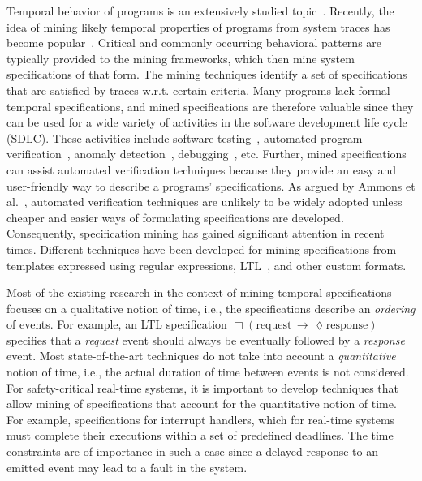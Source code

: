 \documentclass[]{sigplanconf}
\begin{document}
Temporal behavior of programs is an extensively studied topic~\cite{lamport1978time, dwyer1999patterns}. %
Recently, the idea of mining likely temporal properties of programs from system traces has become popular~\cite{lemieux2015general}.
Critical and commonly occurring behavioral patterns are typically provided to the mining frameworks, which then mine system specifications of that form. The mining techniques identify a set of specifications that are satisfied by traces w.r.t. certain criteria.
Many programs lack formal temporal specifications, and mined specifications are therefore valuable since they can be used for a wide variety of activities in the software development life cycle (SDLC).
These activities include software testing~\cite{dallmeier2010generating}, automated program verification~\cite{kincaid2015automated}, anomaly detection~\cite{christodorescu2008mining}, debugging~\cite{gabel2010online}, etc.
Further, mined specifications can assist automated verification techniques because they provide an easy and user-friendly way to describe a programs' specifications. As argued by Ammons et al.~\cite{DBLP:conf/popl/AmmonsBL02}, automated verification techniques are unlikely to be widely adopted unless cheaper and easier ways of formulating specifications are developed.
Consequently, specification mining has gained significant attention in recent times. Different techniques have been developed for mining specifications from templates expressed using regular expressions, LTL~\cite{bonato2012dynamic}, and other custom formats.

Most of the existing research in the context of mining temporal specifications focuses on a qualitative notion of time, i.e., the specifications describe an \emph{ordering} of events. For example, an LTL specification $\Box(\mathrm{request}\,\rightarrow\,\lozenge \mathrm{response})$ specifies that a \emph{request} event should always be eventually followed by a \emph{response} event. Most state-of-the-art techniques do not take into account a \emph{quantitative} notion of time, i.e., the actual duration of time between events is not considered.
For safety-critical real-time systems, it is important to develop techniques that allow mining of specifications that account for the quantitative notion of time.
For example, specifications for interrupt handlers, which for real-time systems must complete their executions within a set of predefined deadlines. The time constraints are of importance in such a case since a delayed response to an emitted event may lead to a fault in the system.
\end{document}
